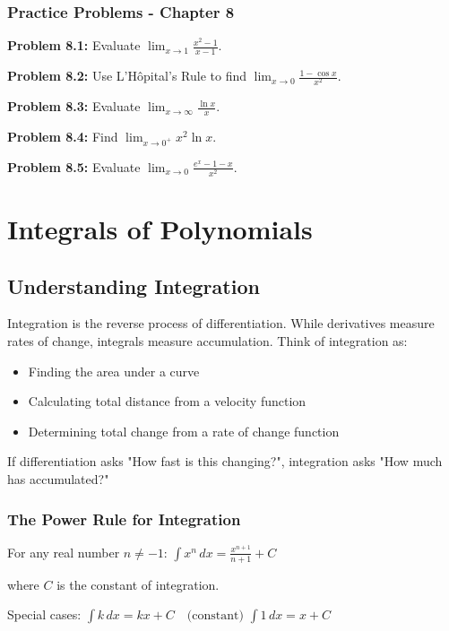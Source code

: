 \documentclass[12pt,a4paper]{book}
\theoremstyle{definition}
\begin{document}
\subsection{Practice Problems - Chapter 8}

\textbf{Problem 8.1:} Evaluate $\lim_{x \to 1} \frac{x^2 - 1}{x - 1}$.

\textbf{Problem 8.2:} Use L'Hôpital's Rule to find $\lim_{x \to 0} \frac{1 - \cos x}{x^2}$.

\textbf{Problem 8.3:} Evaluate $\lim_{x \to \infty} \frac{\ln x}{x}$.

\textbf{Problem 8.4:} Find $\lim_{x \to 0^+} x^2 \ln x$.

\textbf{Problem 8.5:} Evaluate $\lim_{x \to 0} \frac{e^x - 1 - x}{x^2}$.

\chapter{Integrals of Polynomials}

\section{Understanding Integration}

\begin{intuition}
Integration is the reverse process of differentiation. While derivatives measure rates of change, integrals measure accumulation. Think of integration as:
\begin{itemize}
    \item Finding the area under a curve
    \item Calculating total distance from a velocity function
    \item Determining total change from a rate of change function
\end{itemize}

If differentiation asks "How fast is this changing?", integration asks "How much has accumulated?"
\end{intuition}

\subsection{The Power Rule for Integration}

\begin{keyformula}
For any real number $n \neq -1$:
$\int x^n \, dx = \frac{x^{n+1}}{n+1} + C$

where $C$ is the constant of integration.

Special cases:
$\int k \, dx = kx + C \quad \text{(constant)}$
$\int 1 \, dx = x + C$
\end{keyformula}
\end{document}
